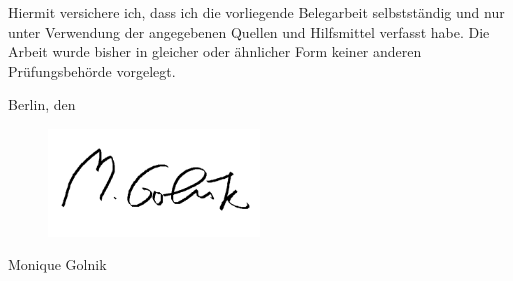 \documentclass[11pt,a4paper,ngerman]{report}
\begin{document}
	Hiermit versichere ich, dass ich die vorliegende Belegarbeit selbstständig und nur unter
	Verwendung der angegebenen Quellen und Hilfsmittel verfasst habe. Die Arbeit wurde bisher
	in gleicher oder ähnlicher Form keiner anderen Prüfungsbehörde vorgelegt.
	
	\vskip 1cm
	
	Berlin, den \date{\today}
	
	\vskip 1.5cm
	\begin{figure} [H]
			\includegraphics[width=0.5\textwidth]{mgo.png}
	\end{figure}
	Monique Golnik
	
	\listoffigures
	\listoftables
	\printbibliography[heading=bibintoc, title={Quellenverzeichnis}]

	
\end{document}
